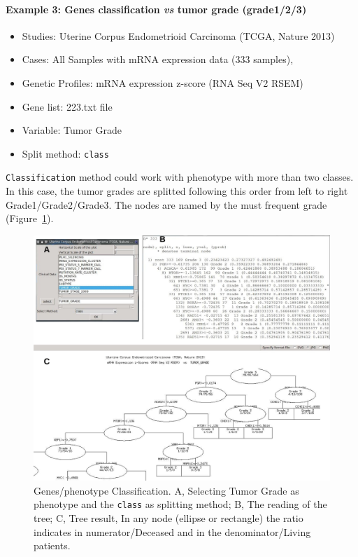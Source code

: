 \documentclass[a4paper]{article}
\begin{document}
\paragraph{Example 3: Genes classification \emph{vs} tumor grade (grade1/2/3) }

\begin{itemize}
    \item Studies:  Uterine Corpus Endometrioid Carcinoma (TCGA, Nature 2013)
    \item Cases: All Samples with mRNA expression data (333 samples),
    \item Genetic Profiles: mRNA expression z-score (RNA Seq V2 RSEM)
    \item Gene list: 223.txt file
    \item  Variable: Tumor Grade
    \item Split method: \texttt{class}
 \end{itemize}

\texttt{Classification} method could work with phenotype with more than two classes. In this case, the tumor grades are splitted following this order from left to right Grade1/Grade2/Grade3. The nodes are named by the must frequent grade (Figure~\ref{GenePhenoClass3}).


\begin{figure}[!ht]
  \centering
 \includegraphics[scale=1]{image/GenePhenoClass3.png}
 \caption{Genes/phenotype Classification. A, Selecting Tumor Grade as phenotype and the \texttt{class} as splitting method; B, The reading of the tree; C, Tree result, In any node (ellipse or rectangle) the ratio indicates in numerator/Deceased and in the denominator/Living patients. }
 \label{GenePhenoClass3}
 \end{figure}
\end{document}
